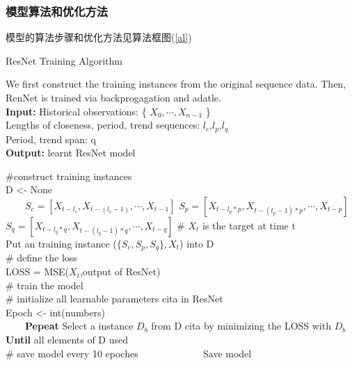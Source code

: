 \subsubsection*{模型算法和优化方法}
模型的算法步骤和优化方法见算法框图(\ref{al}) 
\begin{algorithm}[t]
\caption{ResNet Training Algorithm} %
We first construct the training
instances from the original sequence data. Then, RenNet is trained via backprogagation and adatle.\\
\hspace*{0.02in} {\bf Input:} %
Historical observations: \{ $X_0,\cdots,X_{n-1}$ \}\\
\hspace*{0.02in} Lengths of closeness, period, trend sequences: $l_c$,$l_p$,$l_q$\\
\hspace*{0.02in} Period, trend span: q\\
\hspace*{0.02in} {\bf Output:} %
learnt ResNet model\\
\begin{algorithmic}[1]
\State \#construct training instances\\
D <- None\\ %
　　\State $S_c = [X_{t-l_c},X_{t-(l_c-1)},\cdots,X_{t-1}]$
	\State $S_p = [X_{t-l_p*p},X_{t-(l_p-1)*p},\cdots,X_{t-p}]$
	\State $S_q = [X_{t-l_q*q},X_{t-(l_q-1)*q},\cdots,X_{t-q}]$
\# $X_t$ is the target at time t\\
Put an training instance ($\{S_c,S_p,S_q \},X_t$) into D\\
\EndFor
\# define the loss
\\
LOSS = MSE($X_t$,output of ResNet)\\
\# train the model\\
\# initialize all learnable parameters cita in ResNet\\

Epoch <- int(numbers)\\



　　\State \textbf{Pepeat}
	\State Select a instance $D_b$ from D
	\State cita by minimizing the LOSS with $D_b$
\textbf{Until} all elements of D used\\
\# save model every 10 epoches
　　　　\State Save model
　　\EndIf
\EndFor
\end{algorithmic}
\label{al}
\end{algorithm}